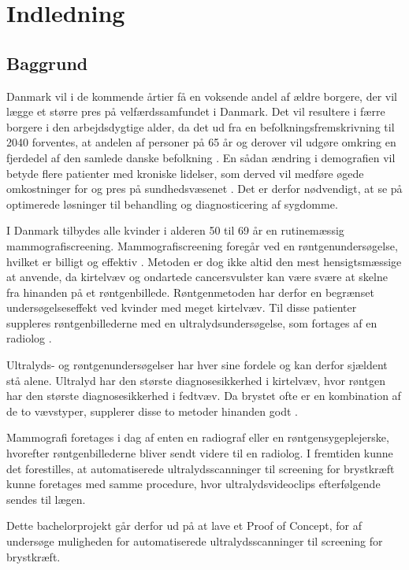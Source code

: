 \chapter{Indledning}
\section{Baggrund}
Danmark vil i de kommende årtier få en voksende andel af ældre borgere, der vil lægge et større pres på velfærdssamfundet i Danmark. Det vil resultere i færre borgere i den arbejdsdygtige alder, da det ud fra en befolkningsfremskrivning til 2040 forventes, at andelen af personer på 65 år og derover vil udgøre omkring en fjerdedel af den samlede danske befolkning \cite{Befolk}. En sådan ændring i demografien vil betyde flere patienter med kroniske lidelser, som derved vil medføre øgede omkostninger for og pres på sundhedsvæsenet \citep{Pres}. Det er derfor nødvendigt, at se på optimerede løsninger til behandling og diagnosticering af sygdomme. 

I Danmark tilbydes alle kvinder i alderen 50 til 69 år en rutinemæssig mammografiscreening. Mammografiscreening foregår ved en røntgenundersøgelse, hvilket er billigt og effektiv \cite{Afsloring}. Metoden er dog ikke altid den mest hensigtsmæssige at anvende, da kirtelvæv og ondartede cancersvulster kan være svære at skelne fra hinanden på et røntgenbillede. Røntgenmetoden har derfor en begrænset undersøgelseseffekt ved kvinder med meget kirtelvæv. Til disse patienter suppleres røntgenbillederne med en ultralydsundersøgelse, som fortages af en radiolog \cite{Ultralyd}.

Ultralyds- og røntgenundersøgelser har hver sine fordele og kan derfor sjældent stå alene. Ultralyd har den største diagnosesikkerhed i kirtelvæv, hvor røntgen har den største diagnosesikkerhed i fedtvæv. Da brystet ofte er en kombination af de to vævstyper, supplerer disse to metoder hinanden godt \cite{Ultralyd}. 

Mammografi foretages i dag af enten en radiograf eller en røntgensygeplejerske, hvorefter røntgenbillederne bliver sendt videre til en radiolog. I fremtiden kunne det forestilles, at automatiserede ultralydsscanninger til screening for brystkræft kunne foretages med samme procedure, hvor ultralydsvideoclips efterfølgende sendes til lægen.

Dette bachelorprojekt går derfor ud på at lave et Proof of Concept, for af undersøge muligheden for automatiserede ultralydsscanninger til screening for brystkræft.
\newpage

